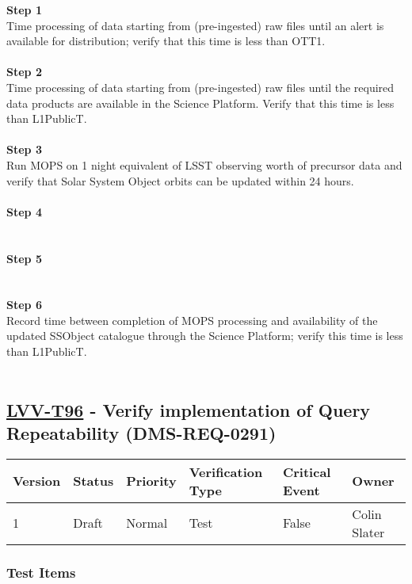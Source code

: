 \textbf{Step 1}\\
Time processing of data starting from (pre-ingested) raw files until an
alert is available for distribution; verify that this time is less than
OTT1.\\
~\\
\textbf{Step 2}\\
Time processing of data starting from (pre-ingested) raw files until the
required data products are available in the Science Platform. Verify
that this time is less than L1PublicT.\\
~\\
\textbf{Step 3}\\
Run MOPS on 1 night equivalent of LSST observing worth of precursor data
and verify that Solar System Object orbits can be updated within 24
hours.\\
~\\
\textbf{Step 4}\\
~\\
~\\
\textbf{Step 5}\\
~\\
~\\
\textbf{Step 6}\\
Record time between completion of MOPS processing and availability of
the updated SSObject catalogue through the Science Platform; verify this
time is less than L1PublicT.\\
~\\

\hypertarget{lvv-t96---verify-implementation-of-query-repeatability-dms-req-0291}{%
\subsection{\texorpdfstring{\href{https://jira.lsstcorp.org/secure/Tests.jspa\#/testCase/LVV-T96}{LVV-T96}
- Verify implementation of Query Repeatability
(DMS-REQ-0291)}{LVV-T96 - Verify implementation of Query Repeatability (DMS-REQ-0291)}}\label{lvv-t96---verify-implementation-of-query-repeatability-dms-req-0291}}

\begin{longtable}[]{@{}llllll@{}}
\toprule
Version & Status & Priority & Verification Type & Critical Event &
Owner\tabularnewline
\midrule
\endhead
1 & Draft & Normal & Test & False & Colin Slater\tabularnewline
\bottomrule
\end{longtable}

\hypertarget{test-items-72}{%
\subsubsection{Test Items}\label{test-items-72}}

